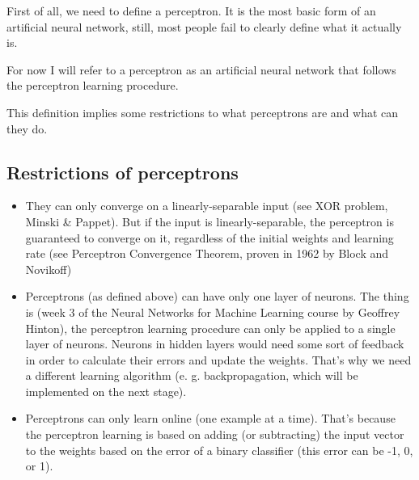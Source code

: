 First of all, we need to define a perceptron. It is the most basic form of an artificial neural network, still, most people fail to clearly define what it actually is.

For now I will refer to a perceptron as an artificial neural network that follows the perceptron learning procedure.

This definition implies some restrictions to what perceptrons are and what can they do.

\subsection{Restrictions of perceptrons}
\begin{itemize}
  \item They can only converge on a linearly-separable input (see XOR problem, Minski \& Pappet). But if the input is linearly-separable, the perceptron is guaranteed to converge on it, regardless of the initial weights and learning rate (see Perceptron Convergence Theorem, proven in 1962 by Block and Novikoff)
  \item Perceptrons (as defined above) can have only one layer of neurons. The thing is (week 3 of the Neural Networks for Machine Learning course by Geoffrey Hinton), the perceptron learning procedure can only be applied to a single layer of neurons. Neurons in hidden layers would need some sort of feedback in order to calculate their errors and update the weights. That’s why we need a different learning algorithm (e. g. backpropagation, which will be implemented on the next stage).
  \item Perceptrons can only learn online (one example at a time). That’s because the perceptron learning is based on adding (or subtracting) the input vector to the weights based on the error of a binary classifier (this error can be -1, 0, or 1).
\end{itemize}

